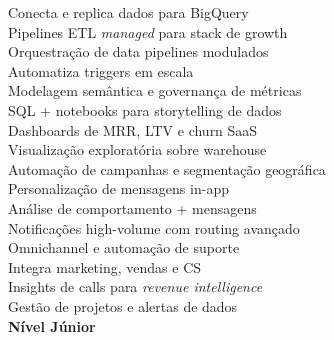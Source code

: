  Conecta e replica dados para BigQuery\\
 Pipelines ETL \textit{managed} para stack de growth\\
 Orquestração de data pipelines modulados\\
 Automatiza triggers em escala\\
[0.5em]

 Modelagem semântica e governança de métricas\\
 SQL + notebooks para storytelling de dados\\
 Dashboards de MRR, LTV e churn SaaS\\
 Visualização exploratória sobre warehouse\\
[0.5em]

 Automação de campanhas e segmentação geográfica\\
 Personalização de mensagens in-app\\
 Análise de comportamento + mensagens\\
 Notificações high-volume com routing avançado\\
[0.5em]

 Omnichannel e automação de suporte\\
 Integra marketing, vendas e CS\\
 Insights de calls para \textit{revenue intelligence}\\
 Gestão de projetos e alertas de dados\\

\textbf{Nível Júnior}

